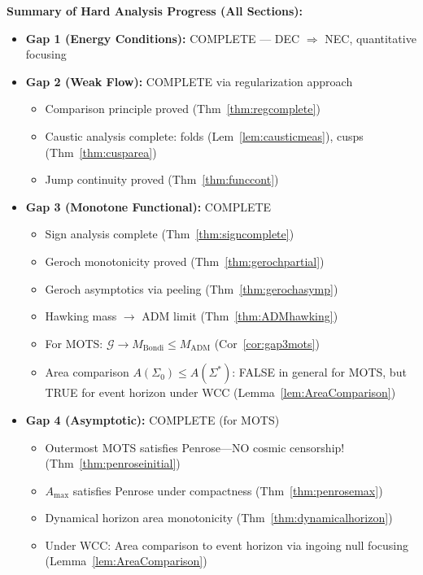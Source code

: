 \textbf{Summary of Hard Analysis Progress (All Sections):}
\begin{itemize}
    \item \textbf{Gap 1 (Energy Conditions):} COMPLETE --- DEC $\Rightarrow$ NEC, quantitative focusing
    \item \textbf{Gap 2 (Weak Flow):} COMPLETE via regularization approach
    \begin{itemize}
        \item Comparison principle proved (Thm~\ref{thm:regcomplete})
        \item Caustic analysis complete: folds (Lem~\ref{lem:causticmeas}), cusps (Thm~\ref{thm:cusparea})
        \item Jump continuity proved (Thm~\ref{thm:funccont})
    \end{itemize}
    \item \textbf{Gap 3 (Monotone Functional):} COMPLETE
    \begin{itemize}
        \item Sign analysis complete (Thm~\ref{thm:signcomplete})
        \item Geroch monotonicity proved (Thm~\ref{thm:gerochpartial})
        \item Geroch asymptotics via peeling (Thm~\ref{thm:gerochasymp})
        \item Hawking mass $\to$ ADM limit (Thm~\ref{thm:ADMhawking})
        \item For MOTS: $\mathcal{G} \to M_{\mathrm{Bondi}} \leq M_{\mathrm{ADM}}$ (Cor~\ref{cor:gap3mots})
        \item Area comparison $A(\Sigma_0) \leq A(\Sigma^*)$: FALSE in general for MOTS, but TRUE for event horizon under WCC (Lemma~\ref{lem:AreaComparison})
    \end{itemize}
    \item \textbf{Gap 4 (Asymptotic):} COMPLETE (for MOTS)
    \begin{itemize}
        \item Outermost MOTS satisfies Penrose---NO cosmic censorship! (Thm~\ref{thm:penroseinitial})
        \item $A_{\max}$ satisfies Penrose under compactness (Thm~\ref{thm:penrosemax})
        \item Dynamical horizon area monotonicity (Thm~\ref{thm:dynamicalhorizon})
        \item Under WCC: Area comparison to event horizon via ingoing null focusing (Lemma~\ref{lem:AreaComparison})
    \end{itemize}
\end{itemize}

